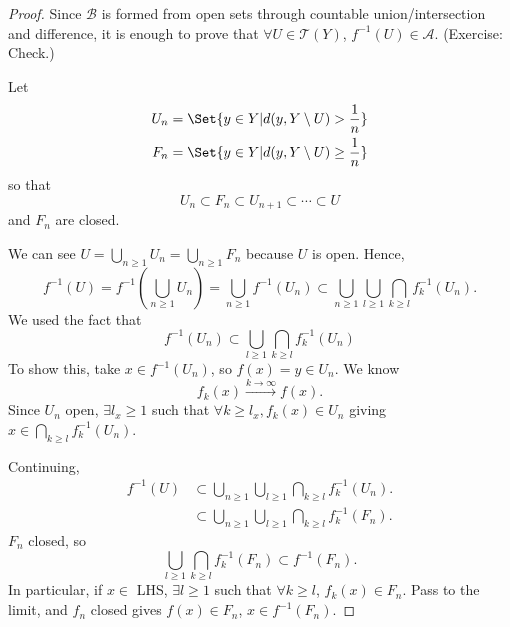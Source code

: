 \documentclass[twoside]{article}
\begin{document}
\begin{proof}
    Since $\mathscr{B}$ is formed from open sets through countable union/intersection and difference, it is enough to prove that $\forall U \in \mathscr{T}(Y)$, $f^{-1}(U) \in \mathscr{A}$. (Exercise: Check.)

    Let
    \begin{align*}
        U_n &= \Set{y \in Y | d(y, Y \setminus U) > \frac{1}{n}} \\
        F_n &= \Set{y \in Y | d(y, Y \setminus U) \geq \frac{1}{n}}
    \end{align*}
    so that
    \begin{equation*}
        U_n \subset F_n \subset U_{n+1} \subset \dotsb \subset U
    \end{equation*}
    and $F_n$ are closed.

    We can see $U = \bigcup_{n \geq 1} U_n = \bigcup_{n \geq 1} F_n$ because $U$ is open. %
    Hence,
    \begin{equation*}
        f^{-1}(U) = f^{-1} \left(\bigcup_{n \geq 1} U_n\right) = \bigcup_{n \geq 1} f^{-1}(U_n) \subset \bigcup_{n \geq 1} \bigcup_{l \geq 1} \bigcap_{k \geq l} f^{-1}_k(U_n).
    \end{equation*}
    We used the fact that
    \begin{equation*}f^{-1}(U_n) \subset \bigcup_{l \geq 1} \bigcap_{k \geq l} f_k^{-1}(U_n)\end{equation*}
    To show this, take $x \in f^{-1}(U_n)$, so $f(x) = y \in U_n$.
    We know
    \begin{equation*}
        f_k(x) \xrightarrow{k \to \infty} f(x).
    \end{equation*}
    Since $U_n$ open, $\exists l_x \geq 1$ such that $\forall k \geq l_x, f_k(x) \in U_n$ giving $x \in \bigcap_{k \geq l} f_k^{-1}(U_n)$.

    Continuing,
    \begin{align*}
        f^{-1}(U) &\subset \bigcup_{n \geq 1} \bigcup_{l \geq 1} \bigcap_{k \geq l} f_k^{-1}(U_n). \\
        &\subset \bigcup_{n \geq 1} \bigcup_{l \geq 1} \bigcap_{k \geq l} f_k^{-1}(F_n).
    \end{align*}
    $F_n$ closed, so
    \begin{equation*}
        \bigcup_{l \geq 1} \bigcap_{k \geq l} f_k^{-1} (F_n) \subset f^{-1}(F_n).
    \end{equation*}
    In particular, if $x \in$ LHS, $\exists l \geq 1$ such that $\forall k \geq l$, $f_k(x) \in F_n$.
    Pass to the limit, and $f_n$ closed gives $f(x) \in F_n$, $x \in f^{-1}(F_n)$.


\end{proof}
\end{document}
